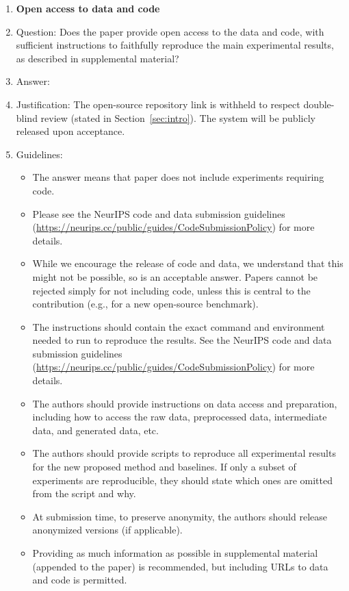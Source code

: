 \documentclass{article}
\begin{document}
\begin{enumerate}
\item {\bf Open access to data and code}
    \item[] Question: Does the paper provide open access to the data and code, with sufficient instructions to faithfully reproduce the main experimental results, as described in supplemental material?
    \item[] Answer: 
    \item[] Justification: The open-source repository link is withheld to respect double-blind review (stated in Section~\ref{sec:intro}). The system will be publicly released upon acceptance.
    \item[] Guidelines:
    \begin{itemize}
        \item The answer \answerNA{} means that paper does not include experiments requiring code.
        \item Please see the NeurIPS code and data submission guidelines (\url{https://neurips.cc/public/guides/CodeSubmissionPolicy}) for more details.
        \item While we encourage the release of code and data, we understand that this might not be possible, so \answerNo{} is an acceptable answer. Papers cannot be rejected simply for not including code, unless this is central to the contribution (e.g., for a new open-source benchmark).
        \item The instructions should contain the exact command and environment needed to run to reproduce the results. See the NeurIPS code and data submission guidelines (\url{https://neurips.cc/public/guides/CodeSubmissionPolicy}) for more details.
        \item The authors should provide instructions on data access and preparation, including how to access the raw data, preprocessed data, intermediate data, and generated data, etc.
        \item The authors should provide scripts to reproduce all experimental results for the new proposed method and baselines. If only a subset of experiments are reproducible, they should state which ones are omitted from the script and why.
        \item At submission time, to preserve anonymity, the authors should release anonymized versions (if applicable).
        \item Providing as much information as possible in supplemental material (appended to the paper) is recommended, but including URLs to data and code is permitted.
    \end{itemize}



\end{enumerate}
\end{document}
